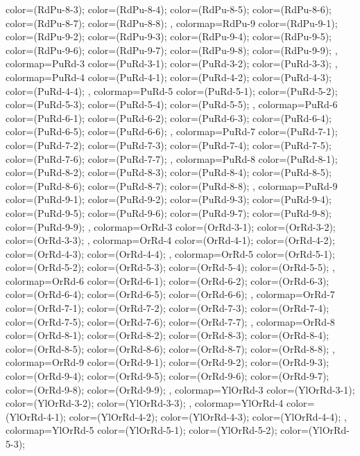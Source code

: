 {{  color=(RdPu-8-3);
  color=(RdPu-8-4);
  color=(RdPu-8-5);
  color=(RdPu-8-6);
  color=(RdPu-8-7);
  color=(RdPu-8-8);
},
colormap={RdPu-9}{
  color=(RdPu-9-1);
  color=(RdPu-9-2);
  color=(RdPu-9-3);
  color=(RdPu-9-4);
  color=(RdPu-9-5);
  color=(RdPu-9-6);
  color=(RdPu-9-7);
  color=(RdPu-9-8);
  color=(RdPu-9-9);
},
colormap={PuRd-3}{
  color=(PuRd-3-1);
  color=(PuRd-3-2);
  color=(PuRd-3-3);
},
colormap={PuRd-4}{
  color=(PuRd-4-1);
  color=(PuRd-4-2);
  color=(PuRd-4-3);
  color=(PuRd-4-4);
},
colormap={PuRd-5}{
  color=(PuRd-5-1);
  color=(PuRd-5-2);
  color=(PuRd-5-3);
  color=(PuRd-5-4);
  color=(PuRd-5-5);
},
colormap={PuRd-6}{
  color=(PuRd-6-1);
  color=(PuRd-6-2);
  color=(PuRd-6-3);
  color=(PuRd-6-4);
  color=(PuRd-6-5);
  color=(PuRd-6-6);
},
colormap={PuRd-7}{
  color=(PuRd-7-1);
  color=(PuRd-7-2);
  color=(PuRd-7-3);
  color=(PuRd-7-4);
  color=(PuRd-7-5);
  color=(PuRd-7-6);
  color=(PuRd-7-7);
},
colormap={PuRd-8}{
  color=(PuRd-8-1);
  color=(PuRd-8-2);
  color=(PuRd-8-3);
  color=(PuRd-8-4);
  color=(PuRd-8-5);
  color=(PuRd-8-6);
  color=(PuRd-8-7);
  color=(PuRd-8-8);
},
colormap={PuRd-9}{
  color=(PuRd-9-1);
  color=(PuRd-9-2);
  color=(PuRd-9-3);
  color=(PuRd-9-4);
  color=(PuRd-9-5);
  color=(PuRd-9-6);
  color=(PuRd-9-7);
  color=(PuRd-9-8);
  color=(PuRd-9-9);
},
colormap={OrRd-3}{
  color=(OrRd-3-1);
  color=(OrRd-3-2);
  color=(OrRd-3-3);
},
colormap={OrRd-4}{
  color=(OrRd-4-1);
  color=(OrRd-4-2);
  color=(OrRd-4-3);
  color=(OrRd-4-4);
},
colormap={OrRd-5}{
  color=(OrRd-5-1);
  color=(OrRd-5-2);
  color=(OrRd-5-3);
  color=(OrRd-5-4);
  color=(OrRd-5-5);
},
colormap={OrRd-6}{
  color=(OrRd-6-1);
  color=(OrRd-6-2);
  color=(OrRd-6-3);
  color=(OrRd-6-4);
  color=(OrRd-6-5);
  color=(OrRd-6-6);
},
colormap={OrRd-7}{
  color=(OrRd-7-1);
  color=(OrRd-7-2);
  color=(OrRd-7-3);
  color=(OrRd-7-4);
  color=(OrRd-7-5);
  color=(OrRd-7-6);
  color=(OrRd-7-7);
},
colormap={OrRd-8}{
  color=(OrRd-8-1);
  color=(OrRd-8-2);
  color=(OrRd-8-3);
  color=(OrRd-8-4);
  color=(OrRd-8-5);
  color=(OrRd-8-6);
  color=(OrRd-8-7);
  color=(OrRd-8-8);
},
colormap={OrRd-9}{
  color=(OrRd-9-1);
  color=(OrRd-9-2);
  color=(OrRd-9-3);
  color=(OrRd-9-4);
  color=(OrRd-9-5);
  color=(OrRd-9-6);
  color=(OrRd-9-7);
  color=(OrRd-9-8);
  color=(OrRd-9-9);
},
colormap={YlOrRd-3}{
  color=(YlOrRd-3-1);
  color=(YlOrRd-3-2);
  color=(YlOrRd-3-3);
},
colormap={YlOrRd-4}{
  color=(YlOrRd-4-1);
  color=(YlOrRd-4-2);
  color=(YlOrRd-4-3);
  color=(YlOrRd-4-4);
},
colormap={YlOrRd-5}{
  color=(YlOrRd-5-1);
  color=(YlOrRd-5-2);
  color=(YlOrRd-5-3);
}}
